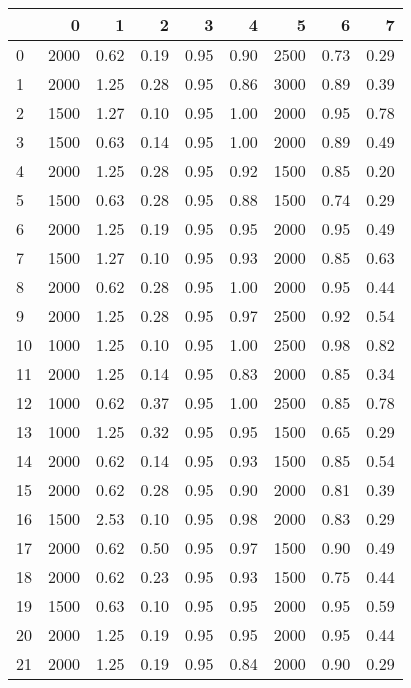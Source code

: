 \begin{tabular}{lrrrrrrrr}
\toprule
{} &     0 &     1 &     2 &     3 &     4 &     5 &     6 &     7 \\
\midrule
0  &  2000 &  0.62 &  0.19 &  0.95 &  0.90 &  2500 &  0.73 &  0.29 \\
1  &  2000 &  1.25 &  0.28 &  0.95 &  0.86 &  3000 &  0.89 &  0.39 \\
2  &  1500 &  1.27 &  0.10 &  0.95 &  1.00 &  2000 &  0.95 &  0.78 \\
3  &  1500 &  0.63 &  0.14 &  0.95 &  1.00 &  2000 &  0.89 &  0.49 \\
4  &  2000 &  1.25 &  0.28 &  0.95 &  0.92 &  1500 &  0.85 &  0.20 \\
5  &  1500 &  0.63 &  0.28 &  0.95 &  0.88 &  1500 &  0.74 &  0.29 \\
6  &  2000 &  1.25 &  0.19 &  0.95 &  0.95 &  2000 &  0.95 &  0.49 \\
7  &  1500 &  1.27 &  0.10 &  0.95 &  0.93 &  2000 &  0.85 &  0.63 \\
8  &  2000 &  0.62 &  0.28 &  0.95 &  1.00 &  2000 &  0.95 &  0.44 \\
9  &  2000 &  1.25 &  0.28 &  0.95 &  0.97 &  2500 &  0.92 &  0.54 \\
10 &  1000 &  1.25 &  0.10 &  0.95 &  1.00 &  2500 &  0.98 &  0.82 \\
11 &  2000 &  1.25 &  0.14 &  0.95 &  0.83 &  2000 &  0.85 &  0.34 \\
12 &  1000 &  0.62 &  0.37 &  0.95 &  1.00 &  2500 &  0.85 &  0.78 \\
13 &  1000 &  1.25 &  0.32 &  0.95 &  0.95 &  1500 &  0.65 &  0.29 \\
14 &  2000 &  0.62 &  0.14 &  0.95 &  0.93 &  1500 &  0.85 &  0.54 \\
15 &  2000 &  0.62 &  0.28 &  0.95 &  0.90 &  2000 &  0.81 &  0.39 \\
16 &  1500 &  2.53 &  0.10 &  0.95 &  0.98 &  2000 &  0.83 &  0.29 \\
17 &  2000 &  0.62 &  0.50 &  0.95 &  0.97 &  1500 &  0.90 &  0.49 \\
18 &  2000 &  0.62 &  0.23 &  0.95 &  0.93 &  1500 &  0.75 &  0.44 \\
19 &  1500 &  0.63 &  0.10 &  0.95 &  0.95 &  2000 &  0.95 &  0.59 \\
20 &  2000 &  1.25 &  0.19 &  0.95 &  0.95 &  2000 &  0.95 &  0.44 \\
21 &  2000 &  1.25 &  0.19 &  0.95 &  0.84 &  2000 &  0.90 &  0.29 \\

\end{tabular}
